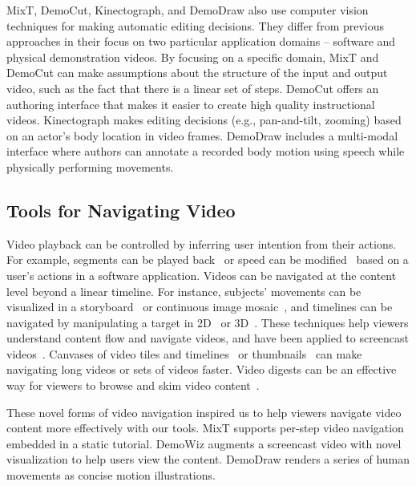 MixT, DemoCut, Kinectograph, and DemoDraw also use computer vision techniques for making automatic editing decisions. They differ from previous approaches in their focus on two particular application domains -- software and physical demonstration videos.
%
By focusing on a specific domain, MixT and DemoCut can make assumptions about the structure of the input and output video, such as the fact that there is a linear set of steps. DemoCut offers an authoring interface that makes it easier to create high quality instructional videos.
%
Kinectograph makes editing decisions (e.g., pan-and-tilt, zooming) based on an actor's body location in video frames.
%
DemoDraw includes a multi-modal interface where authors can annotate a recorded body motion using speech while physically performing movements.



\subsection{Tools for Navigating Video}
Video playback can be controlled by inferring user intention from their actions. For example, segments can be played back~\cite{Pongnumkul:2011ju} or speed can be modified~\cite{Cheng:2009:SUV:1518701.1518823} based on a user's actions in a software application.
%
Videos can be navigated at the content level beyond a linear timeline. For instance, subjects' movements can be visualized in a storyboard~\cite{goldman2006schematic} or continuous image mosaic~\cite{Teodosio:2005:SS:1047936.1047940}, and timelines can be navigated by manipulating a target in 2D~\cite{Dragicevic:2008:VBD:1357054.1357096,Goldman:2008:VOA:1449715.1449719,Karrer:2008:DDM:1357054.1357097} or 3D~\cite{Nguyen:2013:DMV:2470654.2466150}.
%
These techniques help viewers understand content flow and navigate videos, and have been applied to screencast videos~\cite{Denoue:2013:RDM:2451176.2451190,Nguyen:2015:MST:2702123.2702209}.
%
Canvases of video tiles and timelines~\cite{Al-Hajri:2014:VPH:2611105.2557106} or thumbnails~\cite{Matejka:2013:SIO:2470654.2466149} can make navigating long videos or sets of videos faster. Video digests can be an effective way for viewers to browse and skim video content~\cite{Pavel:2014:VDB:2642918.2647400}.

These novel forms of video navigation inspired us to help viewers navigate video content more effectively with our tools.
%
MixT supports per-step video navigation embedded in a static tutorial.
%
DemoWiz augments a screencast video with novel visualization to help users view the content.
%
DemoDraw renders a series of human movements as concise motion illustrations.

